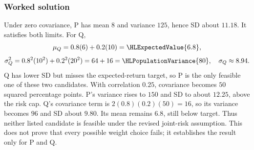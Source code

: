 \subsubsection*{Worked solution}\label{sol:sec:advanced1}
Under zero covariance, P has mean $8$ and variance $125$, hence SD about $11.18$. It satisfies both limits. For Q,
\[
\mu_Q=0.8(6)+0.2(10)=\HLExpectedValue{6.8},
\]
\[
\sigma_Q^2=0.8^2(10^2)+0.2^2(20^2)=64+16=\HLPopulationVariance{80},
\quad \sigma_Q\approx8.94.
\]
Q has lower SD but misses the expected-return target, so P is the only feasible one of these two candidates.
With correlation $0.25$, covariance becomes $50$ squared percentage points. P's variance rises to $150$ and SD to about $12.25$, above the risk cap. Q's covariance term is $2(0.8)(0.2)(50)=16$, so its variance becomes $96$ and SD about $9.80$. Its mean remains $6.8$, still below target. Thus neither listed candidate is feasible under the revised joint-risk assumption. This does not prove that every possible weight choice fails; it establishes the result only for P and Q.



